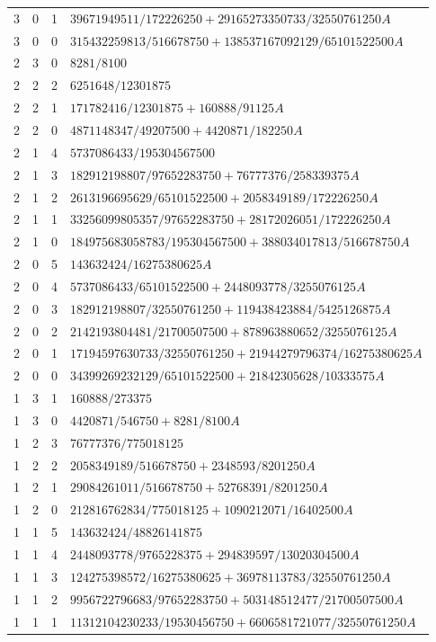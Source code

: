 \begin{longtable}{rrrl}
3 & 0 & 1 & $39671949511/172226250+29165273350733/32550761250A$\\
3 & 0 & 0 & $315432259813/516678750+138537167092129/65101522500A$\\
2 & 3 & 0 & $8281/8100$\\
2 & 2 & 2 & $6251648/12301875$\\
2 & 2 & 1 & $171782416/12301875+160888/91125A$\\
2 & 2 & 0 & $4871148347/49207500+4420871/182250A$\\
2 & 1 & 4 & $5737086433/195304567500$\\
2 & 1 & 3 & $182912198807/97652283750+76777376/258339375A$\\
2 & 1 & 2 & $2613196695629/65101522500+2058349189/172226250A$\\
2 & 1 & 1 & $33256099805357/97652283750+28172026051/172226250A$\\
2 & 1 & 0 & $184975683058783/195304567500+388034017813/516678750A$\\
2 & 0 & 5 & $143632424/16275380625A$\\
2 & 0 & 4 & $5737086433/65101522500+2448093778/3255076125A$\\
2 & 0 & 3 & $182912198807/32550761250+119438423884/5425126875A$\\
2 & 0 & 2 & $2142193804481/21700507500+878963880652/3255076125A$\\
2 & 0 & 1 & $17194597630733/32550761250+21944279796374/16275380625A$\\
2 & 0 & 0 & $34399269232129/65101522500+21842305628/10333575A$\\
1 & 3 & 1 & $160888/273375$\\
1 & 3 & 0 & $4420871/546750+8281/8100A$\\
1 & 2 & 3 & $76777376/775018125$\\
1 & 2 & 2 & $2058349189/516678750+2348593/8201250A$\\
1 & 2 & 1 & $29084261011/516678750+52768391/8201250A$\\
1 & 2 & 0 & $212816762834/775018125+1090212071/16402500A$\\
1 & 1 & 5 & $143632424/48826141875$\\
1 & 1 & 4 & $2448093778/9765228375+294839597/13020304500A$\\
1 & 1 & 3 & $124275398572/16275380625+36978113783/32550761250A$\\
1 & 1 & 2 & $9956722796683/97652283750+503148512477/21700507500A$\\
1 & 1 & 1 & $11312104230233/19530456750+6606581721077/32550761250A$\\

\end{longtable}
